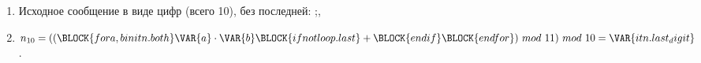 \begin{enumerate}
\item Исходное сообщение в виде цифр (всего 10), без последней:
;,

\item $n_{10} = ((\BLOCK{for a, b in itn.both}\VAR{a}\cdot \VAR{b}\BLOCK{if not loop.last}+\BLOCK{endif}\BLOCK{endfor}) \ mod \ 11) \ mod \ 10 = \VAR{itn.last_digit}$.


\end{enumerate}